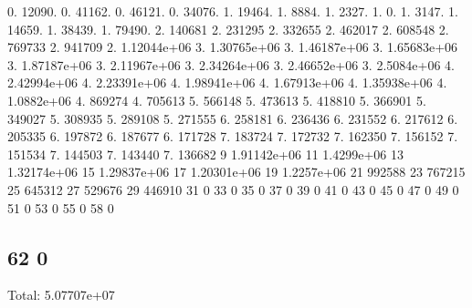 0. 12090. 0. 41162. 0. 46121. 0. 34076. 1. 19464. 1. 8884. 1. 2327. 1. 0. 1. 3147. 1. 14659. 1. 38439. 1. 79490. 2. 140681 2. 231295 2. 332655 2. 462017 2. 608548 2. 769733 2. 941709 2. 1.\+12044e+06 3. 1.\+30765e+06 3. 1.\+46187e+06 3. 1.\+65683e+06 3. 1.\+87187e+06 3. 2.\+11967e+06 3. 2.\+34264e+06 3. 2.\+46652e+06 3. 2.\+5084e+06 4. 2.\+42994e+06 4. 2.\+23391e+06 4. 1.\+98941e+06 4. 1.\+67913e+06 4. 1.\+35938e+06 4. 1.\+0882e+06 4. 869274 4. 705613 5. 566148 5. 473613 5. 418810 5. 366901 5. 349027 5. 308935 5. 289108 5. 271555 6. 258181 6. 236436 6. 231552 6. 217612 6. 205335 6. 197872 6. 187677 6. 171728 7. 183724 7. 172732 7. 162350 7. 156152 7. 151534 7. 144503 7. 143440 7. 136682 9 1.\+91142e+06 11 1.\+4299e+06 13 1.\+32174e+06 15 1.\+29837e+06 17 1.\+20301e+06 19 1.\+2257e+06 21 992588 23 767215 25 645312 27 529676 29 446910 31 0 33 0 35 0 37 0 39 0 41 0 43 0 45 0 47 0 49 0 51 0 53 0 55 0 58 0 \subsection*{62 0 }

Total\+: 5.\+07707e+07 